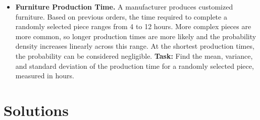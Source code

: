 \begin{itemize}
		\item \textbf{Furniture Production Time.}
		A manufacturer produces customized furniture. Based on previous orders,
		the time required to complete a randomly selected piece ranges from
		4 to 12 hours. More complex pieces are more common, so longer
		production times are more likely and the probability density increases
		linearly across this range. At the shortest production times, the
		probability can be considered negligible.
		\textbf{Task:} Find the mean, variance, and standard deviation of the production time for a randomly selected piece,
		measured in hours.

		
	\end{itemize}
	


\newpage
\restoregeometry

\vspace*{-15mm}

\section{Solutions}


\setlength{\columnseprule}{0.4pt}


